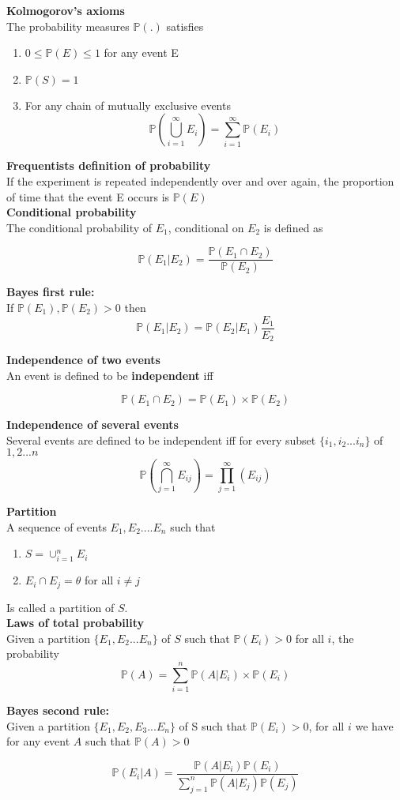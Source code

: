 \textbf{Kolmogorov's axioms}\\
The probability measures $\mathbb{P}(.)$ satisfies\\

\begin{enumerate}
\item $0 \leq \mathbb{P}(E) \leq 1$ for any event E
\item $\mathbb{P}(S) = 1$
\item For any chain of mutually exclusive events
$$  \mathbb{P} \left(\bigcup_{i=1}^\infty E_i \right) = \sum_{i=1}^\infty \mathbb{P} (E_i) $$
\end{enumerate}

\textbf{Frequentists definition of probability}\\
If the experiment is repeated independently over and over again, the proportion of time that the event E occurs is $\mathbb{P}(E)$\\

\textbf{Conditional probability}\\
The conditional probability of $E_1$, conditional on $E_2$ is defined as

$$\mathbb{P}(E_1|E_2) = \frac{\mathbb{P}(E_1 \cap E_2)}{\mathbb{P}(E_2)} $$

\textbf{Bayes first rule:}\\
If $\mathbb{P}(E_1), \mathbb{P}(E_2) > 0$ then
$$\mathbb{P}(E_1|E_2) = \mathbb{P}(E_2|E_1) \frac{E_1}{E_2}$$

\textbf{Independence of two events}\\
An event is defined to be \textbf{independent} iff

$$\mathbb{P}(E_1 \cap E_2) =\mathbb{P}(E_1) \times \mathbb{P}(E_2) $$ 

\textbf{Independence of several events}\\
Several events are defined to be independent iff for every subset $\{ i_1, i_2 ... i_n \}$ of ${1,2...n}$\\

$$\mathbb{P}(\bigcap_{j=1}^\infty E_{ij}) = \prod_{j=1}^\infty (E_{ij})$$

\textbf{Partition}\\
A sequence of events $E_1, E_2 ....E_n$ such that
\begin{enumerate}
\item $S = \cup_{i=1}^n E_i$
\item $E_i \cap E_j = \theta$ for all $i \neq j$
\end{enumerate}
Is called a partition of $S$.\\

\textbf{Laws of total probability}\\
Given a partition $\{ E_1, E_2 ... E_n \}$ of $S$ such that $\mathbb{P}(E_i) > 0$ for all $i$, the probability 
$$\mathbb{P}(A) = \sum_{i=1}^n \mathbb{P}(A|E_i) \times \mathbb{P}(E_i)$$

\textbf{Bayes second rule:}\\
Given a partition $\{ E_1, E_2, E_3 ...E_n \}$ of S such that $\mathbb{P}(E_i) > 0$, for all $i$ we have for any event $A$ such that $\mathbb{P}(A) > 0$

$$\mathbb{P}(E_i|A)= \frac{\mathbb{P}(A|E_i) \mathbb{P}(E_i)}{\sum_{j=1}^n \mathbb{P}(A|E_j) \mathbb{P}(E_j)}$$